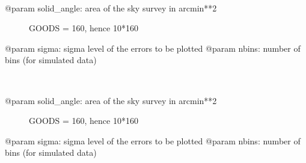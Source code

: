 \documentclass[letterpaper,10pt,english]{sphinxmanual}
\begin{document}
\begin{fulllineitems}
\label{SamPy.herschel:SamPy.herschel.plotluminosityfunctions.plot_luminosityfunction}~\begin{description}
\item[{@param solid\_angle: area of the sky survey in arcmin**2}] \leavevmode
GOODS = 160, hence 10*160

\end{description}

@param sigma: sigma level of the errors to be plotted
@param nbins: number of bins (for simulated data)

\end{fulllineitems}



\begin{fulllineitems}
\label{SamPy.herschel:SamPy.herschel.plotluminosityfunctions.plot_luminosityfunction2}~\begin{description}
\item[{@param solid\_angle: area of the sky survey in arcmin**2}] \leavevmode
GOODS = 160, hence 10*160

\end{description}

@param sigma: sigma level of the errors to be plotted
@param nbins: number of bins (for simulated data)

\end{fulllineitems}


\end{document}
